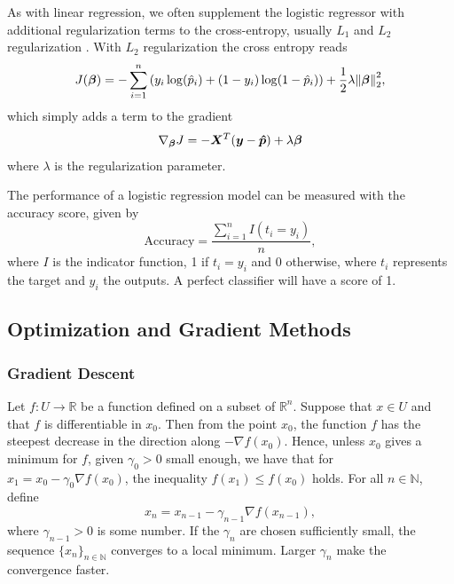 As with linear regression, we often supplement the logistic regressor with additional regularization terms to the cross-entropy, usually $L_1$ and $L_2$ regularization \cite{logreglec}. With $L_2$ regularization the cross entropy reads
\begin{equation}\label{eq:cross-ent with L2 reg}
    J (\bm{\beta}) = - \sum_{i=1}^n \qty(y_i \log(\hat{p}_i) + (1-y_i) \log(1 - \hat{p}_i) ) + \frac{1}{2} \lambda \norm{\bm{\beta}}_2^2,
\end{equation}
which simply adds a term to the gradient
\begin{equation}\label{eq:logcost deriv L2 reg}
    \nabla_{\bm{\beta}} J = -\bm{X}^T \qty(\bm{y} -\bm{\hat{p}}) + \lambda \bm{\beta}
\end{equation}
where $\lambda$ is the regularization parameter. 


The performance of a logistic regression model can be measured with the accuracy score, given by
\begin{equation}\label{eq:accuracy score}
    \text{Accuracy} = \frac{\sum_{i=1}^n I(t_i = y_i)}{n},
\end{equation}
where $I$ is the indicator function, 1 if $t_i = y_i$ and 0 otherwise, where $t_i$ represents the target and $y_i$ the outputs. A perfect classifier will have a score of 1.



\subsection{Optimization and Gradient Methods}\label{sec:optim theory}

\subsubsection{Gradient Descent}\label{sec:gradient descent}
Let $f\colon U\to\mathbb{R}$ be a function defined on a subset of $\mathbb{R}^n$. Suppose that $x\in U$ and that $f$ is differentiable in $x_0$. Then from the point $x_0$, the function $f$ has the steepest decrease in the direction along $-\nabla f(x_0)$. Hence, unless $x_0$ gives a minimum for $f$, given $\gamma_0 > 0$ small enough, we have that for $x_1 = x_0 - \gamma_0\nabla f(x_0)$, the inequality $f(x_1)\le f(x_0)$ holds. For all $n\in\mathbb{N}$, define
\begin{equation*}
    x_n = x_{n-1} - \gamma_{n-1}\nabla f(x_{n-1}),
\end{equation*}
where $\gamma_{n-1}>0$ is some number. If the $\gamma_{n}$ are chosen sufficiently small, the sequence $\{x_n\}_{n\in\mathbb{N}}$ converges to a local minimum. Larger $\gamma_{n}$ make the convergence faster.

